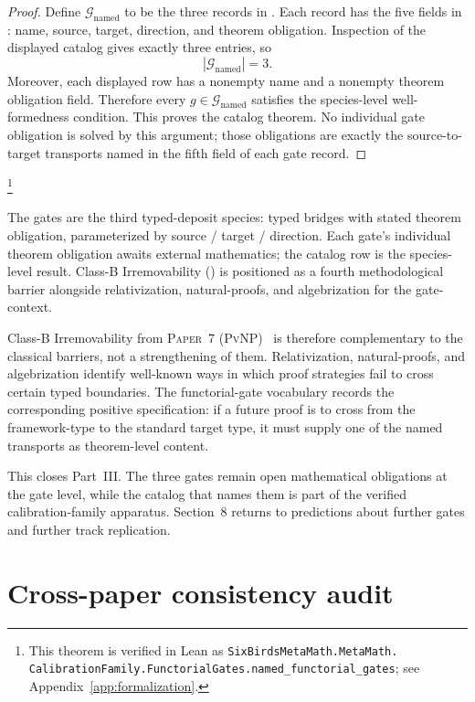 \documentclass[11pt]{article}
\newcommand{\PaperPvNP}{\textsc{Paper~7 (PvNP)}}
\theoremstyle{definition}
\begin{document}
\begin{proof}
Define \(\mathcal G_{\mathrm{named}}\) to be the three records in
.  Each record has the five fields in
: name, source, target, direction, and theorem
obligation.  Inspection of the displayed catalog gives exactly three
entries, so
\[
  |\mathcal G_{\mathrm{named}}|=3.
\]
Moreover, each displayed row has a nonempty name and a nonempty theorem
obligation field.  Therefore every \(g\in\mathcal G_{\mathrm{named}}\)
satisfies the species-level well-formedness condition.  This proves the
catalog theorem.  No individual gate obligation is solved by this
argument; those obligations are exactly the source-to-target transports
named in the fifth field of each gate record.
\end{proof}\footnote{\raggedright This theorem is verified in Lean as
\texttt{SixBirdsMetaMath.MetaMath.\allowbreak
CalibrationFamily.FunctorialGates.\allowbreak named\_functorial\_gates};
see Appendix~\ref{app:formalization}.}

The gates are the third typed-deposit species: typed bridges with stated
theorem obligation, parameterized by source / target / direction. Each
gate's individual theorem obligation awaits external mathematics; the
catalog row is the species-level result. Class-B Irremovability
(\cite{Tsiokos2026PvNP}) is positioned as a fourth methodological barrier
alongside relativization, natural-proofs, and algebrization
\cite{BakerGillSolovay1975Relativization,RazborovRudich1997NaturalProofs,AaronsonWigderson2009Algebrization}
for the gate-context.

Class-B Irremovability from \PaperPvNP\ \cite{Tsiokos2026PvNP} is
therefore complementary to the classical barriers, not a strengthening
of them.  Relativization, natural-proofs, and algebrization identify
well-known ways in which proof strategies fail to cross certain typed
boundaries.  The functorial-gate vocabulary records the corresponding
positive specification: if a future proof is to cross from the
framework-type to the standard target type, it must supply one of the
named transports as theorem-level content.

This closes Part~III.  The three gates remain open mathematical
obligations at the gate level, while the catalog that names them is part
of the verified calibration-family apparatus.  Section~8 returns to
predictions about further gates and further track replication.
 \section{Cross-paper consistency audit}\label{sec:audit}
\end{document}
